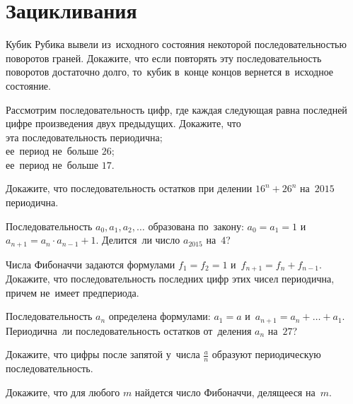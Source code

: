 
\section*{Зацикливания}


\begin{problems}

\item
Кубик Рубика вывели из~исходного состояния некоторой последовательностью
поворотов граней.
Докажите, что если повторять эту последовательность поворотов достаточно долго,
то~кубик в~конце концов вернется в~исходное состояние.

\item
Рассмотрим последовательность цифр, где каждая следующая равна последней цифре
произведения двух предыдущих.
Докажите, что
\\
\sp эта последовательность периодична;
\\
\sp ее~период не~больше $26$;
\\
\sp ее~период не~больше $17$.

\item
Докажите, что последовательность остатков при делении $16^n + 26^n$ на~$2015$
периодична.

\item
Последовательность $a_0, a_1, a_2,\ldots$ образована по~закону:
$a_0 = a_1 = 1$ и~ $a_{n + 1} = a_n \cdot a_{n - 1} + 1$.
Делится~ли число $a_{2015}$ на~$4$?

\item
Числа Фибоначчи задаются формулами
$f_1 = f_2 = 1$ и~$f_{n + 1} = f_n + f_{n - 1}$.
Докажите, что последовательность последних цифр этих чисел периодична, причем
не~имеет предпериода.

\item
Последовательность $a_n$ определена формулами:
$a_1 = a$ и~$a_{n + 1} = a_n + \ldots + a_1$.
Периодична~ли последовательность остатков от~деления $a_n$ на~$27$?

\item
Докажите, что цифры после запятой у~числа $\frac{a}{n}$ образуют периодическую
последовательность.

\item
Докажите, что для любого $m$ найдется число Фибоначчи, делящееся на~$m$.

\end{problems}

